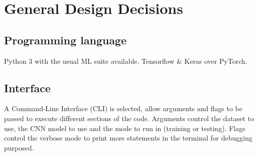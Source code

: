 \section{General Design Decisions}

\subsection{Programming language}

Python 3 with the usual ML suite available.
Tensorflow \& Keras over PyTorch. %

\subsection{Interface}

A Command-Line Interface (CLI) is selected, allow arguments and flags to be passed to execute different sections of the code. Arguments control the dataset to use, the CNN model to use and the mode to run in (training or testing). Flags control the verbose mode to print more statements in the terminal for debugging purposed.